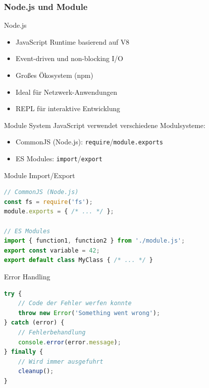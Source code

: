 \subsubsection{Node.js und Module}

\begin{concept}{Node.js}
    \begin{itemize}
        \item JavaScript Runtime basierend auf V8
        \item Event-driven und non-blocking I/O
        \item Großes Ökosystem (npm)
        \item Ideal für Netzwerk-Anwendungen
        \item REPL für interaktive Entwicklung
    \end{itemize}
\end{concept}

\begin{concept}{Module System}
    JavaScript verwendet verschiedene Modulsysteme:
    \begin{itemize}
        \item CommonJS (Node.js): \texttt{require}/\texttt{module.exports}
        \item ES Modules: \texttt{import}/\texttt{export}
    \end{itemize}
\end{concept}

\begin{KR}{Module Import/Export}
\begin{lstlisting}[language=JavaScript, style=basesmol]
// CommonJS (Node.js)
const fs = require('fs');
module.exports = { /* ... */ };

// ES Modules
import { function1, function2 } from './module.js';
export const variable = 42;
export default class MyClass { /* ... */ }
\end{lstlisting}
\end{KR}

\begin{KR}{Error Handling}
\begin{lstlisting}[language=JavaScript, style=basesmol]
try {
    // Code der Fehler werfen konnte
    throw new Error('Something went wrong');
} catch (error) {
    // Fehlerbehandlung
    console.error(error.message);
} finally {
    // Wird immer ausgefuhrt
    cleanup();
}
\end{lstlisting}
\end{KR}

